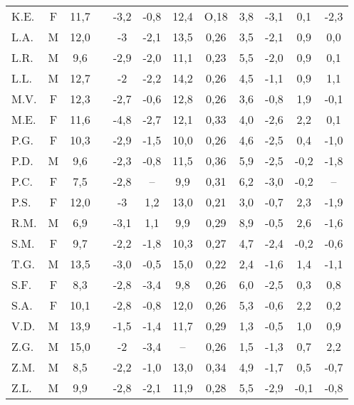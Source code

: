 \begin{sidewaystable}
\begin{tabular}{lccccccccccc}
K.E. & F & 11,7   &  		& -3,2 & -0,8 & 12,4   & O,18 & 3,8 & -3,1 & 0,1  &-2,3                                \\
L.A. & M & 12,0 & \checkmark 	&  -3  & -2,1 & 13,5 & 0,26 & 3,5 & -2,1 & 0,9  & 0,0                     \\
L.R. & M & 9,6  &  		& -2,9 & -2,0 & 11,1 & 0,23 & 5,5 & -2,0 & 0,9  & 0,1                            \\
L.L. & M & 12,7 &  		&  -2  & -2,2 & 14,2 & 0,26 & 4,5 & -1,1 & 0,9  & 1,1                            \\
M.V. & F & 12,3 & \checkmark 	& -2,7 & -0,6 & 12,8 & 0,26 & 3,6 & -0,8 & 1,9  & -0,1                    \\
M.E. & F & 11,6 &  		& -4,8 & -2,7 & 12,1 & 0,33 & 4,0 & -2,6 & 2,2  & 0,1                            \\
P.G. & F & 10,3 & \checkmark 	& -2,9 & -1,5 & 10,0 & 0,26 & 4,6 & -2,5 & 0,4  & -1,0                    \\
P.D. & M & 9,6  &  		& -2,3 & -0,8 & 11,5 & 0,36 & 5,9 & -2,5 & -0,2 & -1,8                           \\
P.C. & F & 7,5  &  		& -2,8 & --   & 9,9  & 0,31 & 6,2 & -3,0 & -0,2 & --                           \\
P.S. & F & 12,0 &  		&  -3  & 1,2  & 13,0 & 0,21 & 3,0 & -0,7 & 2,3  & -1,9                           \\
R.M. & M & 6,9  & \checkmark 	& -3,1 & 1,1  & 9,9  & 0,29 & 8,9 & -0,5 & 2,6  & -1,6                    \\
S.M. & F & 9,7  & \checkmark 	& -2,2 & -1,8 & 10,3 & 0,27 & 4,7 & -2,4 & -0,2 & -0,6                    \\
T.G. & M & 13,5   &             & -3,0 & -0,5 & 15,0 & 0,22 & 2,4 & -1,6 & 1,4 & -1,1     \\
S.F. & F & 8,3  &  		& -2,8 & -3,4 & 9,8  & 0,26 & 6,0 & -2,5 & 0,3  & 0,8                            \\
S.A. & F & 10,1 &  		& -2,8 & -0,8 & 12,0 & 0,26 & 5,3 & -0,6 & 2,2  & 0,2                            \\
V.D. & M & 13,9 &  		& -1,5 & -1,4 & 11,7 & 0,29 & 1,3 & -0,5 & 1,0  & 0,9                            \\
Z.G. & M & 15,0 &  		&  -2  & -3,4 &   --   & 0,26 & 1,5 & -1,3 & 0,7  & 2,2                            \\
Z.M. & M & 8,5  &  		& -2,2 & -1,0 & 13,0 & 0,34 & 4,9 & -1,7 & 0,5  & -0,7                           \\
Z.L. & M & 9,9  &  		& -2,8 & -2,1 & 11,9 & 0,28 & 5,5 & -2,9 & -0,1 & -0,8                           \\

\bottomrule
\end{tabular}
\end{sidewaystable}